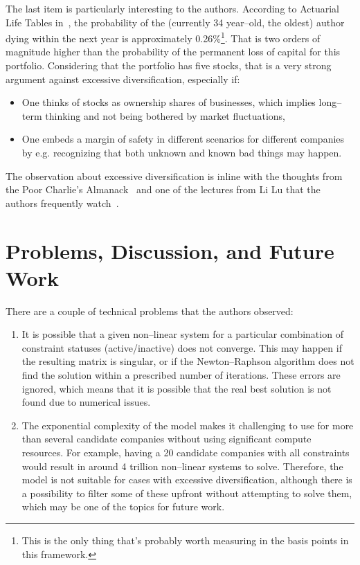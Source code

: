 \documentclass{article}
\begin{document}
\noindent The last item is particularly interesting to the authors. According to
Actuarial Life Tables in~\cite{lifeTables}, the probability of the (currently 34
year--old, the oldest) author dying within the next year is approximately
0.26\%\footnote{This is the only thing that's probably worth measuring in the
basis points in this framework.}. That is two orders of magnitude higher than
the probability of the permanent loss of capital for this portfolio. Considering
that the portfolio has five stocks, that is a very strong argument against
excessive diversification, especially if:
\begin{itemize}
    \item One thinks of stocks as ownership shares of businesses, which implies
    long--term thinking and not being bothered by market fluctuations, 
    \item One embeds a margin of safety in different scenarios for different
    companies by e.g. recognizing that both unknown and known bad things may
    happen.
\end{itemize}

\noindent The observation about excessive diversification is inline with the
thoughts from the Poor Charlie's Almanack~\cite{almanack} and one of the
lectures from Li Lu that the authors frequently watch~\cite{liLuLecture}.

\section{Problems, Discussion, and Future Work}
\label{sec:futureWork}

\noindent There are a couple of technical problems that the authors observed:
\begin{enumerate}
    \item It is possible that a given non--linear system for a particular
    combination of constraint statuses (active/inactive) does not converge. This
    may happen if the resulting matrix is singular, or if the Newton--Raphson
    algorithm does not find the solution within a prescribed number of
    iterations. These errors are ignored, which means that it is possible that
    the real best solution is not found due to numerical issues.
    \item The exponential complexity of the model makes it challenging to
    use for more than several candidate companies without using significant
    compute resources. For example, having a 20 candidate companies with all
    constraints would result in around 4 trillion non--linear systems to solve.
    Therefore, the model is not suitable for cases with excessive
    diversification, although there is a possibility to filter some of these
    upfront without attempting to solve them, which may be one of the topics for
    future work.
\end{enumerate}
\end{document}
